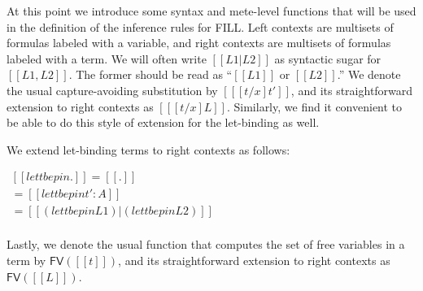 At this point we introduce some syntax and mete-level functions that
will be used in the definition of the inference rules for FILL. Left
contexts are multisets of formulas labeled with a variable, and right
contexts are multisets of formulas labeled with a term.  We will often
write $[[L1 | L2]]$ as syntactic sugar for $[[L1,L2]]$.  The former
should be read as ``$[[L1]]$ or $[[L2]]$.''  We denote the usual
capture-avoiding substitution by $[[ [t/x]t']]$, and its
straightforward extension to right contexts as $[[ [t/x]L]]$.
Similarly, we find it convenient to be able to do this style of
extension for the let-binding as well.
\begin{definition}
  \label{def:delta-let}
  We extend let-binding terms to right contexts as follows:
  \begin{center}
    \begin{math}
      \begin{array}{lll}
        [[ let t be p in .]] = [[.]]\\
        [[ let t be p in (t' : A)]] = [[{let t be p in t'} : A]]\\
        [[ let t be p in (L1 | L2)]] = [[(let t be p in L1) | (let t be p in L2)]]\\
      \end{array}
    \end{math}
  \end{center}
\end{definition}
\noindent
Lastly, we denote the usual function that computes the set of free
variables in a term by $\mathsf{FV}([[t]])$, and its straightforward
extension to right contexts as $\mathsf{FV}([[L]])$.
